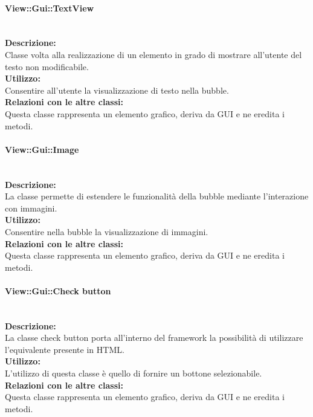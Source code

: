 \paragraph{View::Gui::TextView}\label{gui-tview}\mbox{}\\
\textbf{Descrizione:}\\
Classe volta alla realizzazione di un elemento in grado di mostrare all'utente del testo non modificabile.\\
\textbf{Utilizzo:}\\
Consentire all'utente la visualizzazione di testo nella bubble.\\
\textbf{Relazioni con le altre classi:}\\
Questa classe rappresenta un elemento grafico, deriva da GUI e ne eredita i metodi.\\

\paragraph{View::Gui::Image}\label{gui-image}\mbox{}\\
\textbf{Descrizione:}\\
La classe permette di estendere le funzionalità della bubble mediante l'interazione con immagini.\\
\textbf{Utilizzo:}\\
Consentire nella bubble la visualizzazione di immagini.\\
\textbf{Relazioni con le altre classi:}\\
Questa classe rappresenta un elemento grafico, deriva da GUI e ne eredita i metodi.\\

\paragraph{View::Gui::Check button}\label{gui-check}\mbox{}\\
\textbf{Descrizione:}\\
La classe check button porta all'interno del framework la possibilità di utilizzare l'equivalente presente in HTML.\\
\textbf{Utilizzo:}\\
L'utilizzo di questa classe è quello di fornire un bottone selezionabile.\\
\textbf{Relazioni con le altre classi:}\\
Questa classe rappresenta un elemento grafico, deriva da GUI e ne eredita i metodi.\\

